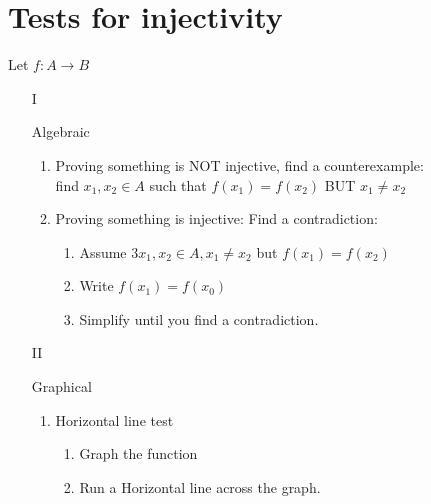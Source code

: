 \documentclass[20pt]{extarticle}
\begin{document}
\section*{\textbf{\color{draculaorange}Tests for injectivity}}
Let $f: A \to B$
\begin{itemize}
  \item[I]{Algebraic
        \begin{enumerate}
          \item {Proving something is NOT injective, find a counterexample:\\
                find $x_1, x_2 \in A$ such that $f\left(x_1\right)=f\left(x_2\right)$ BUT $x_1 \neq x_2$}
          \item{Proving something is injective: Find a contradiction:
                \begin{enumerate}
                  \item{Assume $3 x_1, x_2 \in A, x_1 \neq x_2$ but $f\left(x_1\right)=f\left(x_2\right)$}
                  \item{Write $f\left(x_1\right)=f\left(x_0\right)$}
                  \item{Simplify until you find a contradiction.}
                \end{enumerate}
                }
        \end{enumerate}
        }
        \newpage
        \item[II]{Graphical
        \begin{enumerate}
          \item{Horizontal line test
          \begin{enumerate}
            \item{Graph the function}
            \item{Run a Horizontal line across the graph.}
          \end{enumerate}
          }
        \end{enumerate}
        }
\end{itemize}
\end{document}
